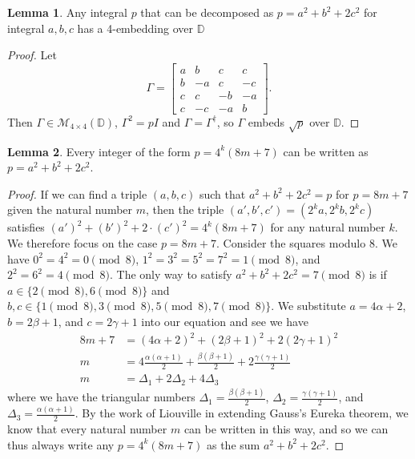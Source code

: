 \documentclass{article}
\theoremstyle{definition}
\theoremstyle{theorem}
\newtheorem{lemma}{Lemma}
\theoremstyle{remark}
\begin{document}
    
	\begin{lemma}
        Any integral $p$ that can be decomposed as $p = a^2+b^2 +2c^2$ for integral $a,b,c$ has a 4-embedding over $\mathbb{D}$
    \end{lemma}
    \begin{proof}
        Let
        \[
            \Gamma = \begin{bmatrix}
                a & b & c & c\\
                b & -a & c & -c\\
                c & c & -b & -a\\
                c & -c & -a & b
            \end{bmatrix}.
        \]
        Then $\Gamma\in\mathcal{M}_{4\times 4}(\mathbb{D})$, $\Gamma^2 = p I$ and $\Gamma = \Gamma^\dagger$, so $\Gamma$ embeds $\sqrt{p}$ over $\mathbb{D}$.
    \end{proof}
    
    \begin{lemma}
        Every integer of the form $p=4^k (8m+7)$ can be written as $p = a^2+b^2+2c^2$.
    \end{lemma}
    \begin{proof}
        If we can find a triple $(a,b,c)$ such that $a^2+b^2+2c^2 = p$ for $p=8m + 7$ given the natural number $m$, then the triple $(a',b',c') = (2^k a,2^k b,2^k c)$ satisfies $(a')^2 +(b')^2 +2\cdot(c')^2 = 4^k (8m+7)$ for any natural number $k$. We therefore focus on the case $p=8m+7$. Consider the squares modulo 8. We have $0^2 = 4^2 = 0\pmod 8$, $1^2 = 3^2 = 5^2 = 7^2 = 1\pmod 8$, and $2^2 = 6^2=4\pmod 8$. The only way to satisfy $a^2+b^2+2c^2 = 7\pmod 8$ is if $a\in\{2\pmod 8,6\pmod 8\}$ and $b,c\in\{1\pmod 8,3\pmod 8,5\pmod 8, 7\pmod 8\}$. We substitute $a=4\alpha + 2$, $b=2\beta+1$, and $c = 2\gamma+1$ into our equation and see we have
        \begin{align*}
            8m+7 &= (4\alpha+2)^2 + (2\beta+1)^2+2 (2\gamma+1)^2\\
            m &= 4\frac{\alpha(\alpha+1)}{2} + \frac{\beta(\beta+1)}{2} + 2\frac{\gamma(\gamma+1)}{2}\\
            m&= \Delta_1 + 2\Delta_2 + 4\Delta_3
        \end{align*}
        where we have the triangular numbers $\Delta_1 = \frac{\beta(\beta+1)}{2}$, $\Delta_2 = \frac{\gamma(\gamma+1)}{2}$, and $\Delta_3 = \frac{\alpha(\alpha+1)}{2}$. By the work of Liouville in extending Gauss's Eureka theorem, we know that every natural number $m$ can be written in this way, and so we can thus always write any $p=4^k(8m+7)$ as the sum $a^2+b^2+2c^2$.
    \end{proof}
    
\end{document}

